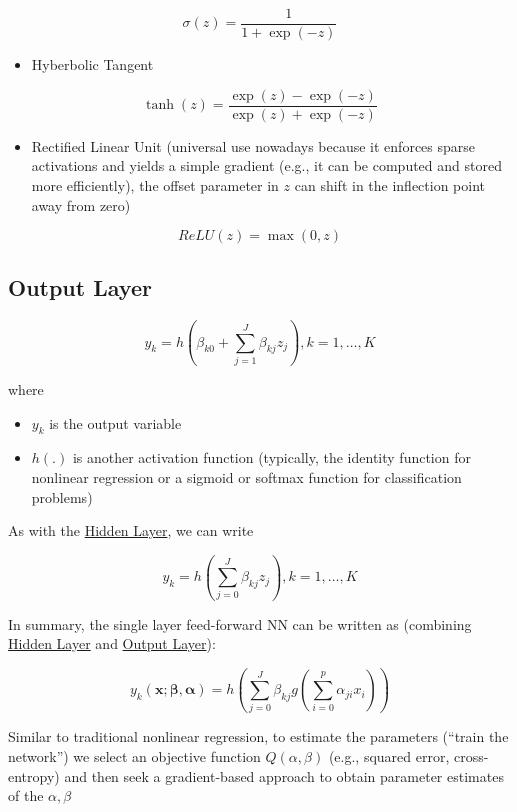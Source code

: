\documentclass[
]{book}
\providecommand{\tightlist}{%
  \setlength{\itemsep}{0pt}\setlength{\parskip}{0pt}}
\begin{document}
\[
\sigma(z) = \frac{1}{1 + \exp(-z)}
\]

\begin{itemize}
\tightlist
\item
  Hyberbolic Tangent
\end{itemize}

\[
\tanh (z) = \frac{ \exp(z) - \exp(-z)}{ \exp(z) + \exp(-z)}
\]

\begin{itemize}
\tightlist
\item
  Rectified Linear Unit (universal use nowadays because it enforces sparse activations and yields a simple gradient (e.g., it can be computed and stored more efficiently), the offset parameter in \(z\) can shift in the inflection point away from zero)
\end{itemize}

\[
ReLU(z) = \max(0,z)
\]

\hypertarget{output-layer}{%
\subsection{Output Layer}\label{output-layer}}

\[
y_k = h(\beta_{k0} + \sum_{j=1}^J \beta_{kj} z_j) , k = 1, \dots, K
\]

where

\begin{itemize}
\item
  \(y_k\) is the output variable
\item
  \(h(.)\) is another activation function (typically, the identity function for nonlinear regression or a sigmoid or softmax function for classification problems)
\end{itemize}

As with the \protect\hyperlink{hidden-layer}{Hidden Layer}, we can write

\[
y_k = h(\sum_{j=0}^J \beta_{kj} z_j), k = 1, \dots, K
\]

In summary, the single layer feed-forward NN can be written as (combining \protect\hyperlink{hidden-layer}{Hidden Layer} and \protect\hyperlink{output-layer}{Output Layer}):

\[
y_k(\mathbf{x}; \mathbf{\beta}, \mathbf{\alpha}) = h(\sum_{j=0}^J \beta_{kj} g(\sum_{i=0}^p \alpha_{ji} x_i))
\]

Similar to traditional nonlinear regression, to estimate the parameters (``train the network'') we select an objective function \(Q(\alpha, \beta)\) (e.g., squared error, cross-entropy) and then seek a gradient-based approach to obtain parameter estimates of the \(\alpha, \beta\)
\end{document}
